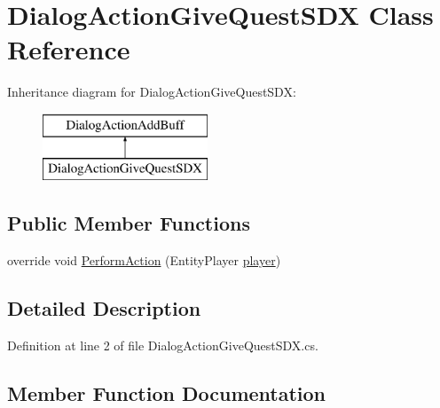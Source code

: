 \hypertarget{class_dialog_action_give_quest_s_d_x}{}\section{Dialog\+Action\+Give\+Quest\+S\+DX Class Reference}
\label{class_dialog_action_give_quest_s_d_x}
Inheritance diagram for Dialog\+Action\+Give\+Quest\+S\+DX\+:\begin{figure}[H]
\begin{center}
\leavevmode
\includegraphics[height=2.000000cm]{class_dialog_action_give_quest_s_d_x}
\end{center}
\end{figure}
\subsection*{Public Member Functions}
\begin{DoxyCompactItemize}
\item 
override void \mbox{\hyperlink{class_dialog_action_give_quest_s_d_x_a77aeb95e9da802b38f793ab608a1ad25}{Perform\+Action}} (Entity\+Player \mbox{\hyperlink{_sphere_i_i_01_music_01_boxes_2_config_2_localization_8txt_a4e2cb8aeff651600ea1cc57fe5a929a4}{player}})
\end{DoxyCompactItemize}


\subsection{Detailed Description}


Definition at line 2 of file Dialog\+Action\+Give\+Quest\+S\+D\+X.\+cs.



\subsection{Member Function Documentation}
\mbox{\label{class_dialog_action_give_quest_s_d_x_a77aeb95e9da802b38f793ab608a1ad25}} 

